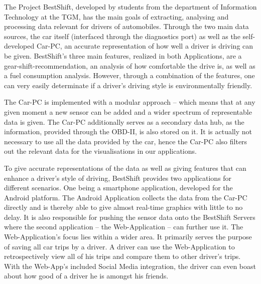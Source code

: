 The Project BestShift, developed by students from the department of Information Technology at the TGM, has the main goals of extracting, analysing and processing data relevant for drivers of automobiles. Through the two main data sources, the car itself (interfaced through the diagnostics port) as well as the self-developed Car-PC, an accurate representation of how well a driver is driving can be given. BestShift’s three main features, realized in both Applications, are a gear-shift-recommendation, an analysis of how comfortable the drive is, as well as a fuel consumption analysis. However, through a combination of the features, one can very easily determinate if a driver’s driving style is environmentally friendly.

The Car-PC is implemented with a modular approach – which means that at any given moment a new sensor can be added and a wider spectrum of representable data is given. The Car-PC additionally serves as a secondary data hub, as the information, provided through the OBD-II, is also stored on it. It is actually not necessary to use all the data provided by the car, hence the Car-PC also filters out the relevant data for the visualisations in our applications.

To give accurate representations of the data as well as giving features that can enhance a driver’s style of driving, BestShift provides two applications for different scenarios. One being a smartphone application, developed for the Android platform. The Android Application collects the data from the Car-PC directly and is thereby able to give almost real-time graphics with little to no delay. It is also responsible for pushing the sensor data onto the BestShift Servers where the second application – the Web-Application – can further use it. The Web-Application’s focus lies within a wider area. It primarily serves the purpose of saving all car trips by a driver. A driver can use the Web-Application to retrospectively view all of his trips and compare them to other driver’s trips. With the Web-App’s included Social Media integration, the driver can even boast about how good of a driver he is amongst his friends.
